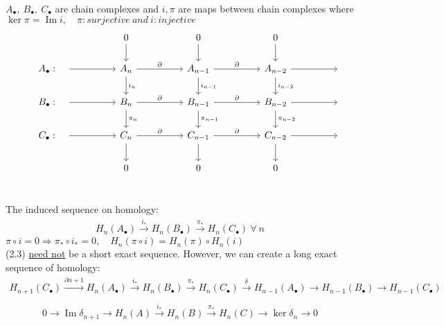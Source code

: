 \documentclass[11pt,a4paper]{report}
\DeclareMathOperator{\Ima}{Im}
\begin{document}
                $A_\bullet, \ B_\bullet, \ C_\bullet$ are chain complexes and $i, \pi$ are maps between chain complexes where \\
                $\ker \pi = \Ima i, \quad \pi:surjective \ and \ i: injective$\\
                \[
                  \begin{tikzcd}[ampersand replacement=\&]
                    \& \            \& \& 0 \arrow[d]                   \&  \& 0      \arrow[d]                 \&  \& 0 \arrow[d] \\
                    \& A_\bullet: \quad \arrow[rr] \& \& A_n \arrow[rr, "\partial"] \arrow[d, "i_n"] \&  \& A_{n-1} \arrow[rr, "\partial"] \arrow[d, "i_{n-1}"] \&  \& A_{n-2} \arrow[d, "i_{n-2}"] \arrow[rr] \& \& \ \\
                    \& B_\bullet: \quad \arrow[rr] \& \& B_n \arrow[rr, "\partial"] \arrow[d, "\pi_n"] \&  \& B_{n-1} \arrow[rr, "\partial"] \arrow[d, "\pi_{n-1}"] \&  \& B_{n-2} \arrow[d, "\pi_{n-2}"] \arrow[rr] \& \& \ \\
                    \& C_\bullet: \quad \arrow[rr] \& \& C_n \arrow[rr, "\partial"] \arrow[d] \&  \& C_{n-1} \arrow[rr, "\partial"] \arrow[d] \&  \& C_{n-2} \arrow[d] \arrow[rr] \& \& \ \\
                    \& \            \& \& 0                             \&  \& 0                                 \&  \& 0\\
                  \end{tikzcd}
                \]
    
                
                The induced sequence on homology: \\
                \begin{align}
                H_n(A_\bullet) \xrightarrow{i_*} H_n(B_\bullet) \xrightarrow{\pi_*} H_n(C_\bullet) \ \forall \  n
                \end{align}
                $\pi \circ i = 0 \Rightarrow \pi_* \circ i_* = 0, \quad H_n(\pi \circ i) = H_n(\pi) \circ H_n(i)$\\
                (2.3) \underline{need not} be a short exact sequence. However, we can create a long exact sequence of homology: \\
                
                 \begin{align*}
                H_{n+1}(C_\bullet) \xrightarrow{\partial n+1} H_n(A_\bullet) \xrightarrow{i_*} H_n(B_\bullet) \xrightarrow{\pi_*} H_n(C_\bullet) \xrightarrow{\delta} H_{n-1}(A_\bullet) \rightarrow H_{n-1}(B_\bullet) \rightarrow H_{n-1}(C_\bullet) \\
                \end{align*}
                \begin{align*}
                0 \rightarrow \Ima \delta_{n+1} \rightarrow H_n(A) \xrightarrow{i_*} H_n(B) \xrightarrow{\pi_*} H_n(C) \rightarrow \ker \delta_n \rightarrow 0 \\
                \\
                \end{align*}
                
\end{document}
